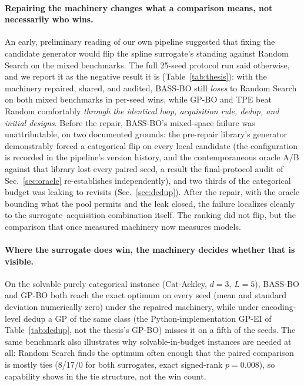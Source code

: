 \documentclass[%
 aip,
 amsmath,amssymb,
 floatfix,
 reprint,%
]{revtex4-1}
\begin{document}
\paragraph{Repairing the machinery changes what a comparison means, not
necessarily who wins.}
An early, preliminary reading of our own pipeline suggested that fixing
the candidate generator would flip the spline surrogate's standing
against Random Search on the mixed benchmarks. The full 25-seed protocol
run said otherwise, and we report it as the negative result it is
(Table~\ref{tab:thesis}): with the machinery repaired, shared, and
audited, BASS-BO still \emph{loses} to Random Search on both mixed
benchmarks in per-seed wins, while GP-BO and TPE beat Random comfortably
\emph{through the identical loop, acquisition rule, dedup, and initial
designs}. Before the
repair, BASS-BO's mixed-space failure was unattributable, on two
documented grounds: the pre-repair library's generator demonstrably
forced a categorical flip on every local candidate (the configuration is
recorded in the pipeline's version history, and the contemporaneous
oracle A/B against that library lost every paired seed, a result the
final-protocol audit of Sec.~\ref{sec:oracle} re-establishes
independently), and two thirds of the categorical budget was leaking to
revisits (Sec.~\ref{sec:dedup}). After the repair, with the oracle
bounding what the pool permits and the leak closed, the failure
localizes cleanly to the surrogate--acquisition combination itself. The
ranking did not flip, but the comparison that once measured machinery
now measures models.

\paragraph{Where the surrogate does win, the machinery decides whether
that is visible.}
On the solvable purely categorical instance (Cat-Ackley, $d{=}3$,
$L{=}5$), BASS-BO and GP-BO both reach the exact optimum on every seed
(mean and standard deviation numerically zero) under the repaired
machinery, while under encoding-level dedup a GP of the same class
(the Python-implementation GP-EI of Table~\ref{tab:dedup}, not the
thesis's GP-BO) misses it on a fifth of the seeds. The same
benchmark also illustrates why solvable-in-budget instances are needed
at all: Random Search finds the optimum often enough that the paired
comparison is mostly ties (8/17/0 for both surrogates,
exact signed-rank $p = 0.008$), so capability shows in the tie structure, not the win
count.
\end{document}
